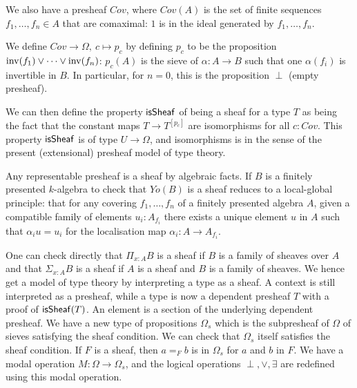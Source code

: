    We also have a presheaf $Cov$, where $Cov(A)$ is the set of finite sequences $f_1,\dots,f_n\in A$ that are comaximal: $1$ is in the
    ideal generated by $f_1,\dots,f_n$.

    We define $Cov\rightarrow\Omega,~c\mapsto p_c$ by defining $p_c$ to be the proposition $\mathrm{inv}(f_1)\vee\dots\vee\mathrm{inv}(f_n)$: $p_c(A)$
    is the sieve of $\alpha:A\rightarrow B$ such that one $\alpha(f_i)$ is invertible in $B$.
    In particular, for $n=0$, this is the proposition $\perp$ (empty presheaf).

    We can then define the property $\mathsf{isSheaf}$ of being a sheaf for a type $T$ as being the fact that
    the constant maps $T\rightarrow T^{[p_c]}$ are isomorphisms for all $c:Cov$.  This property $\mathsf{isSheaf}$ is of type
    $U\rightarrow\Omega$, and isomorphisms is in the sense of the present (extensional) presheaf model of type theory.

    \medskip

    Any representable presheaf is a sheaf by algebraic facts. If $B$ is a finitely presented $k$-algebra
    to check that $Yo(B)$ is a sheaf reduces to a local-global principle: that for any covering $f_1,\dots,f_n$ of a finitely presented
    algebra $A$, given a compatible family of elements $u_i:A_{f_i}$ there exists a unique element $u$ in $A$ such that $\alpha_i u = u_i$
    for the localisation map $\alpha_i:A\rightarrow A_{f_i}$.

    \medskip

    One can check directly that $\Pi_{x:A}B$ is a sheaf if $B$ is a family of sheaves over $A$
    and that $\Sigma_{x:A}B$ is a sheaf if $A$ is a sheaf and $B$ is a family of sheaves. We hence get a model of type theory
    by interpreting a type as a sheaf. A context is still interpreted as a presheaf, while a type is now a dependent presheaf $T$
    with a proof of $\mathsf{isSheaf}(T)$. An element is a section of the underlying dependent presheaf.
    We have a new type of propositions $\Omega_s$ which is the subpresheaf of $\Omega$ of sieves satisfying the sheaf condition.
    We can check that $\Omega_s$ itself satisfies the sheaf condition. If $F$ is a sheaf, then $a =_F b$ is in $\Omega_s$
    for $a$ and $b$ in $F$. We have a modal operation $M:\Omega\rightarrow \Omega_s$, and the logical operations $\perp,\vee,\exists$
    are redefined using this modal operation.

